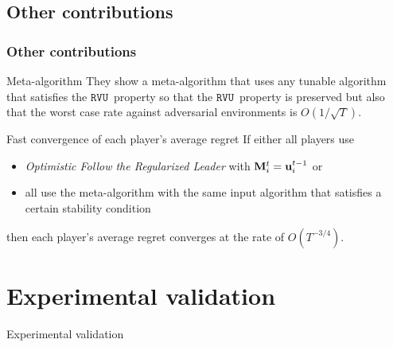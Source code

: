 \documentclass{beamer}
\renewcommand{\vec}[1]{\ensuremath{{\bf #1}}}
\newcommand{\myprop}{\ensuremath{\texttt{RVU}}}
\begin{document}
\subsection{Other contributions}
\begin{frame}
 	\frametitle{Other contributions}
 	
 	
 	\begin{block}{Meta-algorithm}
 		They show a meta-algorithm that uses any tunable algorithm that satisfies the \myprop~property so that
 		the \myprop~property is preserved but also that the worst case rate against adversarial environments is $O(1/\sqrt{T})$.
 	\end{block}
 	\pause
 	
 	\begin{block}{Fast convergence of each player's average regret}
 		If either all players use \\
 		\begin{itemize}
  		\item \textit{Optimistic Follow the Regularized Leader} with $\vec{M}_i^t = \vec{u}_i^{t-1}$ or
 			\item all use the meta-algorithm with the same input algorithm that satisfies a certain stability condition
 		\end{itemize}
 		then each player's average regret converges at the rate of $ O(T^{-3/4})$.
 	\end{block}
 	
\end{frame}









\section{Experimental validation}
\begin{frame}[c]
	\begin{center}
		\Huge Experimental validation
	\end{center}
\end{frame}
\end{document}
